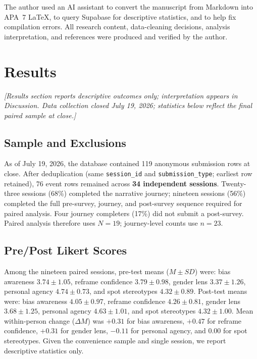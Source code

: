 \documentclass[stu,12pt,floatsintext]{apa7}
\begin{document}
The author used an AI assistant to convert the manuscript from Markdown into APA~7 \LaTeX{}, to query Supabase for descriptive statistics, and to help fix compilation errors. All research content, data-cleaning decisions, analysis interpretation, and references were produced and verified by the author.

\section{Results}

\textit{[Results section reports descriptive outcomes only; interpretation appears in Discussion. Data collection closed July 19, 2026; statistics below reflect the final paired sample at close.]}

\subsection{Sample and Exclusions}

As of July 19, 2026, the database contained 119 anonymous submission rows at close. After deduplication (same \texttt{session\_id} and \texttt{submission\_type}; earliest row retained), 76 event rows remained across \textbf{34 independent sessions}. Twenty-three sessions (68\%) completed the narrative journey; nineteen sessions (56\%) completed the full pre-survey, journey, and post-survey sequence required for paired analysis. Four journey completers (17\%) did not submit a post-survey. Paired analysis therefore uses $N = 19$; journey-level counts use $n = 23$.

\subsection{Pre/Post Likert Scores}

Among the nineteen paired sessions, pre-test means ($M \pm SD$) were: bias awareness $3.74 \pm 1.05$, reframe confidence $3.79 \pm 0.98$, gender lens $3.37 \pm 1.26$, personal agency $4.74 \pm 0.73$, and spot stereotypes $4.32 \pm 0.89$. Post-test means were: bias awareness $4.05 \pm 0.97$, reframe confidence $4.26 \pm 0.81$, gender lens $3.68 \pm 1.25$, personal agency $4.63 \pm 1.01$, and spot stereotypes $4.32 \pm 1.00$. Mean within-person change ($\Delta M$) was $+0.31$ for bias awareness, $+0.47$ for reframe confidence, $+0.31$ for gender lens, $-0.11$ for personal agency, and $0.00$ for spot stereotypes. Given the convenience sample and single session, we report descriptive statistics only.
\end{document}
